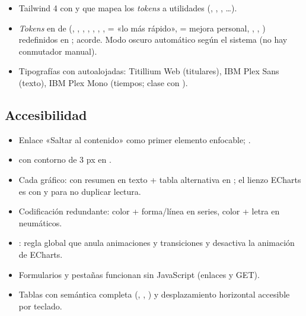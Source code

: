 \begin{itemize}
\item Tailwind 4 con  y  que mapea los \emph{tokens} a utilidades (, , , …).
\item \emph{Tokens} en  de  (, , , , , , ,  = «lo más rápido»,  = mejora personal, , , ) redefinidos en ;  acorde. Modo oscuro automático según el sistema (no hay conmutador manual).
\item Tipografías con  autoalojadas: Titillium Web (titulares), IBM Plex Sans (texto), IBM Plex Mono (tiempos; clase  con ).
\end{itemize}

\subsection{Accesibilidad}

\begin{itemize}
\item Enlace «Saltar al contenido» como primer elemento enfocable; .
\item {} con contorno de 3 px en .
\item Cada gráfico:  con resumen en texto + tabla alternativa en ; el lienzo ECharts es  con  y  para no duplicar lectura.
\item Codificación redundante: color + forma/línea en series, color + letra en neumáticos.
\item {}: regla global que anula animaciones y transiciones y desactiva la animación de ECharts.
\item Formularios y pestañas funcionan sin JavaScript (enlaces y GET).
\item Tablas con semántica completa (, , ) y desplazamiento horizontal accesible por teclado.
\end{itemize}

